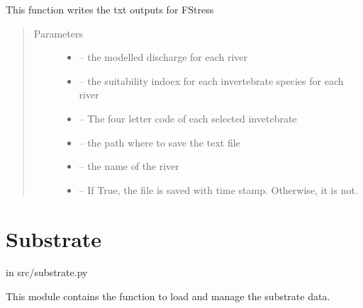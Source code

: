\documentclass[letterpaper,10pt,english]{sphinxmanual}
\begin{document}

\begin{fulllineitems}
\label{\detokenize{index:src.fstress.write_txt}}
This function writes the txt outputs for FStress
\begin{quote}\begin{description}
\item[{Parameters}] \leavevmode\begin{itemize}
\item {} 
 -- the modelled discharge for each river

\item {} 
 -- the suitability indoex for each invertebrate species for each river

\item {} 
 -- The four letter code of each selected invetebrate

\item {} 
 -- the path where to save the text file

\item {} 
 -- the name of the river

\item {} 
 -- If True, the file is saved with time stamp. Otherwise, it is not.

\end{itemize}

\end{description}\end{quote}

\end{fulllineitems}



\section{Substrate}
\label{\detokenize{index:substrate}}
in src/substrate.py

This module contains the function to load and manage the substrate data.
\label{\detokenize{index:module-src.substrate}}
\end{document}
